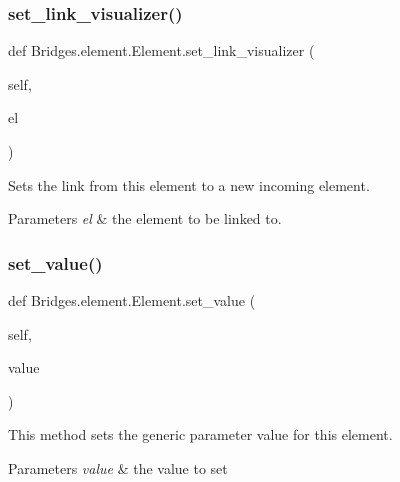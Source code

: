 \subsubsection{\texorpdfstring{set\+\_\+link\+\_\+visualizer()}{set\_link\_visualizer()}}
{\footnotesize\ttfamily def Bridges.\+element.\+Element.\+set\+\_\+link\+\_\+visualizer (\begin{DoxyParamCaption}\item[{}]{self,  }\item[{}]{el }\end{DoxyParamCaption})}



Sets the link from this element to a new incoming element. 


\begin{DoxyParams}{Parameters}
{\em el} & the element to be linked to. \\
\hline
\end{DoxyParams}
\mbox{\label{class_bridges_1_1element_1_1_element_a83180a28821ad37ed8df1f28267df1cf}} 
\subsubsection{\texorpdfstring{set\+\_\+value()}{set\_value()}}
{\footnotesize\ttfamily def Bridges.\+element.\+Element.\+set\+\_\+value (\begin{DoxyParamCaption}\item[{}]{self,  }\item[{}]{value }\end{DoxyParamCaption})}



This method sets the generic parameter value for this element. 


\begin{DoxyParams}{Parameters}
{\em value} & the value to set \\
\hline
\end{DoxyParams}
\mbox{\label{class_bridges_1_1element_1_1_element_a8147ac170339450e4c375fd66dd2f863}} 
